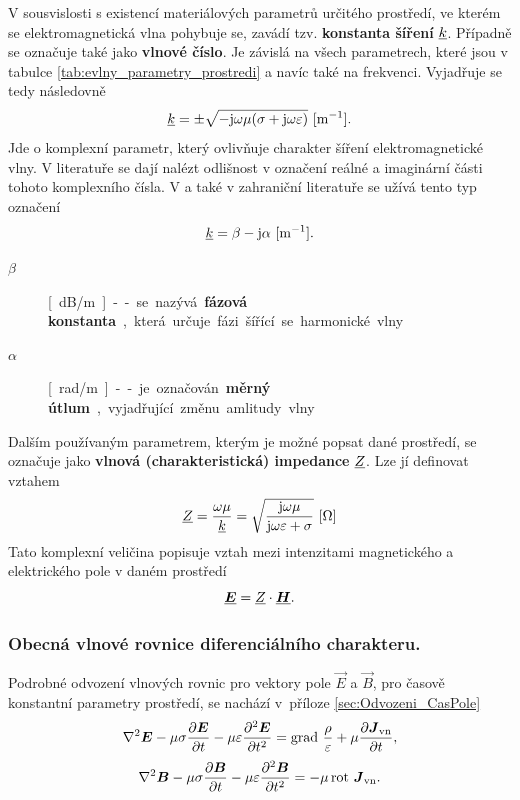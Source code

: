 V sousvislosti s existencí materiálových parametrů určitého prostředí, ve kterém se elektromagnetická vlna pohybuje se, zavádí tzv. {\bf konstanta šíření} ${\underline{k}}$. Případně se označuje také jako {\bf vlnové číslo}. Je závislá na všech parametrech, které jsou v tabulce \ref{tab:evlny_parametry_prostredi} a navíc také na frekvenci. Vyjadřuje se tedy následovně
\begin{displaymath}
	{\underline{k}}=\pm\sqrt{-\mathrm{j}\omega\mu(\sigma+\mathrm{j}\omega\varepsilon)}\mathrm{\ [m^{-1}]}.
\end{displaymath}
Jde o komplexní parametr, který ovlivňuje charakter šíření elektromagnetické vlny. V literatuře se dají nalézt odlišnost v označení reálné a imaginární  části tohoto komplexního čísla. V \cite{emp} a také v zahraniční literatuře se užívá tento typ označení 
\begin{equation}
	{\underline{k}} = \beta - \mathrm{j}\alpha\mathrm{\ [m^{-1}]}.
	\label{rce:evlny_alphabeta}
\end{equation}
\begin{description}
\item[$\beta$]\unit[dB/m]-- se nazývá {\bf fázová konstanta}, která určuje fázi šířící se harmonické vlny
\item[$\alpha$]\unit[rad/m] -- je označován {\bf měrný útlum}, vyjadřující změnu amlitudy vlny
\end{description}
Dalším používaným parametrem, kterým je možné popsat dané prostředí, se označuje jako {\bf vlnová (charakteristická) impedance}  ${\underline{Z}}$. Lze jí definovat vztahem
\begin{displaymath}
	{\underline{Z}} = \frac{\omega\mu}{{\underline{k}}} = \sqrt{\frac{\mathrm{j}\omega\mu}{\mathrm{j}\omega\varepsilon + \sigma}}\mathrm{\ [\Omega]}
\end{displaymath}
Tato komplexní veličina popisuje vztah mezi intenzitami magnetického a elektrického pole v daném prostředí
\begin{displaymath}
	\mbox{\underline{\boldmath$E$}} = {\underline{Z}} \cdot \mbox{\underline{\boldmath$H$}}.
\end{displaymath}

\subsubsection*{Obecná vlnové rovnice diferenciálního charakteru.}
 Podrobné odvození vlnových rovnic pro vektory pole $\vec E$ a $\vec B$, pro časově konstantní parametry prostředí, se nachází v~příloze \ref{sec:Odvozeni_CasPole}
\begin{equation}
	\nabla^{2}\mbox{\boldmath$E$} -\mu\sigma\frac{\partial\mbox{\boldmath$E$}}{\partial t}-\mu\varepsilon\frac{\partial^{2}\mbox{\boldmath$E$}}{\partial t^{2}} = \mathrm{grad}\ \frac{\rho}{\varepsilon}+\mu\frac{\partial\mbox{\boldmath$J$}_{\mathrm{vn}}}{\partial t},
	\label{rce:evlny_VlnR_ElPole}
\end{equation}
\begin{equation}
	\nabla^{2}\mbox{\boldmath$B$} -\mu\sigma\frac{\partial\mbox{\boldmath$B$}}{\partial t}-\mu\varepsilon\frac{\partial^{2}\mbox{\boldmath$B$}}{\partial t^{2}}= -\mu\,\mathrm{rot}\ \mbox{\boldmath$J$}_{\mathrm{vn}}.
	\label{rce:evlny_VlnR_MagPole}
\end{equation}

